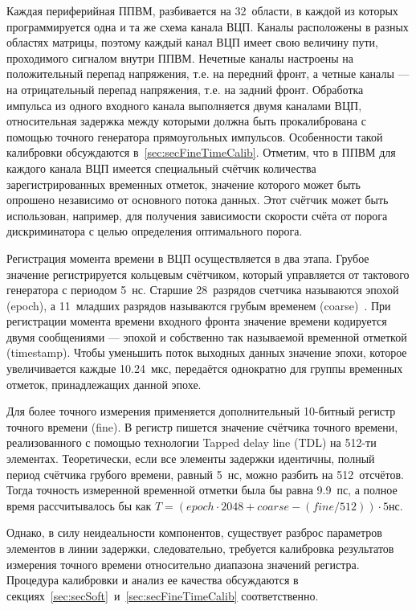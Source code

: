 Каждая периферийная ППВМ, разбивается на 32~области, в каждой из которых программируется одна и та же схема канала ВЦП. 
Каналы расположены в разных областях матрицы, поэтому каждый канал ВЦП имеет свою величину пути, проходимого сигналом внутри ППВМ.
Нечетные каналы настроены на положительный перепад напряжения, т.е. на передний фронт, а четные каналы --- на отрицательный перепад напряжения, т.е. на задний фронт. Обработка импульса из одного входного канала выполняется двумя каналами ВЦП, относительная задержка между которыми должна быть прокалибрована с помощью точного генератора прямоугольных импульсов. Особенности такой калибровки обсуждаются в~\ref{sec:secFineTimeCalib}. Отметим, что в ППВМ для каждого канала ВЦП имеется специальный счётчик количества зарегистрированных временных отметок, значение которого может быть опрошено независимо от основного потока данных. Этот счётчик может быть использован, например, для получения зависимости скорости счёта от порога дискриминатора с целью определения оптимального порога.

Регистрация момента времени в ВЦП осуществляется в два этапа. Грубое значение регистрируется кольцевым счётчиком, который управляется от тактового генератора с периодом 5~нс. Старшие 28~разрядов счетчика называются эпохой (epoch), а 11~младших разрядов называются грубым временем (coarse)~\cite{CAHIT}. При регистрации момента времени входного фронта значение времени кодируется двумя сообщениями --- эпохой и собственно так называемой временной отметкой (timestamp). Чтобы уменьшить поток выходных данных значение эпохи, которое увеличивается каждые 10.24~мкс, передаётся однократно для группы временных отметок, принадлежащих данной эпохе.

Для более точного измерения применяется дополнительный 10-битный регистр точного времени (fine). В регистр пишется значение счётчика точного времени, реализованного с помощью технологии Tapped delay line (TDL) на 512-ти элементах. Теоретически, если все элементы задержки идентичны, полный период счётчика грубого времени, равный 5~нс, можно разбить на 512~отсчётов. Тогда точность измеренной временной отметки была бы равна 9.9~пс, а полное время рассчитывалось бы как $ T = (epoch \cdot 2048 + coarse - (fine/512)) \cdot 5 $нс.

Однако, в силу неидеальности компонентов, существует разброс параметров элементов в линии задержки, следовательно, требуется калибровка результатов измерения точного времени относительно диапазона значений регистра. Процедура калибровки и анализ ее качества обсуждаются в секциях~\ref{sec:secSoft}~и~\ref{sec:secFineTimeCalib} соответственно.

